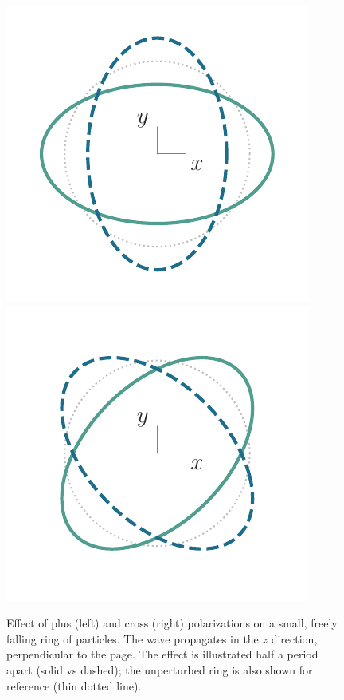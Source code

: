 \documentclass[aps,prd,twocolumn,superscriptaddress,preprintnumbers,floatfix,nofootinbib]{revtex4-2}
\begin{document}
\begin{figure}
\includegraphics[width=0.4\columnwidth]{pol_ring_plus}
\includegraphics[width=0.4\columnwidth]{pol_ring_cross}
\caption{Effect of plus (left) and cross (right) polarizations on a small, freely falling ring of particles. The wave propagates in the $z$ direction, perpendicular to the page. The effect is illustrated half a period apart (solid vs dashed); the unperturbed ring is also shown for reference (thin dotted line).
}
\label{fig:rings}
\end{figure}
\end{document}
